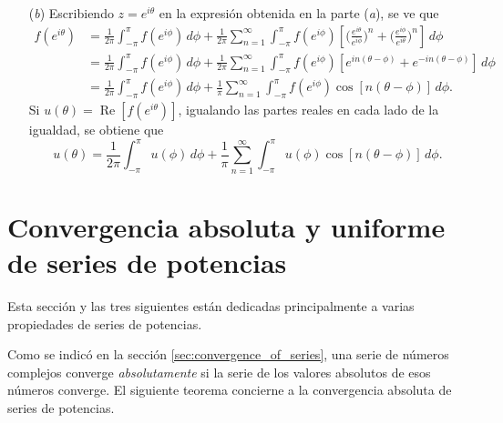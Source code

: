 \documentclass[a4paper]{report}
\renewcommand{\Re}{\operatorname{Re}}
\begin{document}
\begin{enumerate}
\[ \]
 \item[(\textit{b})] Escribiendo \(z=e^{i\theta}\) en la expresión obtenida en la parte (\textit{a}), se ve que 
 \begin{align*}
  f(e^{i\theta})&=\frac{1}{2\pi}\int_{-\pi}^\pi f(e^{i\phi})\,d\phi+\frac{1}{2\pi}\sum_{n=1}^\infty\int_{-\pi}^\pi f(e^{i\phi})\left[\bigg(\frac{e^{i\theta}}{e^{i\phi}}\bigg)^n+\bigg(\frac{e^{i\phi}}{e^{i\theta}}\bigg)^n\right]\,d\phi\\
   &=\frac{1}{2\pi}\int_{-\pi}^\pi f(e^{i\phi})\,d\phi+\frac{1}{2\pi}\sum_{n=1}^\infty\int_{-\pi}^\pi f(e^{i\phi})\left[e^{in(\theta-\phi)}+e^{-in(\theta-\phi)}\right]\,d\phi\\
   &=\frac{1}{2\pi}\int_{-\pi}^\pi f(e^{i\phi})\,d\phi+\frac{1}{\pi}\sum_{n=1}^\infty\int_{-\pi}^\pi f(e^{i\phi})\cos[n(\theta-\phi)]\,d\phi.
 \end{align*}
 Si \(u(\theta)=\Re[f(e^{i\theta})]\), igualando las partes reales en cada lado de la igualdad, se obtiene que 
 \[
  u(\theta)=\frac{1}{2\pi}\int_{-\pi}^\pi u(\phi)\,d\phi+\frac{1}{\pi}\sum_{n=1}^\infty\int_{-\pi}^\pi u(\phi)\cos[n(\theta-\phi)]\,d\phi.
 \]
\end{enumerate}


\section{Convergencia absoluta y uniforme de series de potencias}\label{sec:power_series_absolute_uniform_convergence} 
 
Esta sección y las tres siguientes están dedicadas principalmente a varias propiedades de series de potencias.

Como se indicó en la sección \ref{sec:convergence_of_series}, una serie de números complejos converge \emph{absolutamente} si la serie de los valores absolutos de esos números converge. El siguiente teorema concierne a la convergencia absoluta de series de potencias.
\end{document}
